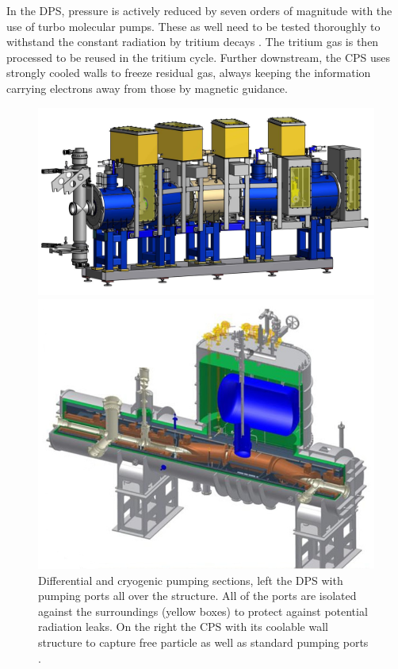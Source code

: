       In the DPS, pressure is actively reduced by seven orders of magnitude with the use of turbo molecular pumps. These as well need to be tested thoroughly to withstand the constant radiation by tritium decays \cite{tritiumTests}. The tritium gas is then processed to be reused in the tritium cycle. Further downstream, the CPS uses strongly cooled walls to freeze residual gas, always keeping the information carrying electrons away from those by magnetic guidance. 
      \begin{figure}
		\begin{minipage}{0.49\textwidth}
				\includegraphics[width = 1.0\textwidth]{graphics/katrinExperiment/DPS.jpg}
		\end{minipage}
		\begin{minipage}{0.49\textwidth}
			\includegraphics[width = 1.0\textwidth]{graphics/katrinExperiment/CPS.jpg}
		\end{minipage}
		\caption[DPS and CPS]{Differential and cryogenic pumping sections, left the DPS with pumping ports all over the structure. All of the ports are isolated against the surroundings (yellow boxes) to protect against potential radiation leaks. On the right the CPS with its coolable wall structure to capture free particle as well as standard pumping ports \cite{DPS, CPS}.}
      \end{figure}
      
